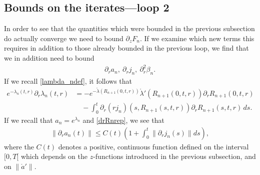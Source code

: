 \documentclass[11pt]{article}
\begin{document}
\subsection{Bounds on the iterates---loop 2}\label{loop2}
%
%
In order to see that the quantities which were
bounded in the previous subsection
do actually converge we need to bound $\partial_z F_n$. If we examine which new
terms this requires in addition to those already bounded in the previous loop,
we find that we in addition need to bound
\begin{align}\label{loop2aim}
  \partial_r a_n,\ \partial_r j_n,\ \partial_r^2 \beta_n .
\end{align}
If we recall \eqref{lambda_ndef}, it follows that
\begin{align*}
  e^{-\lambda_n(t,r)} \partial_r\lambda_n(t,r)
  &= -e^{-\mathring{\lambda}(R_{n+1}(0,t,r))}\mathring{\lambda}'(R_{n+1}(0,t,r))
  \partial_r R_{n+1}(0,t,r)\\
  &\quad
  {}- \int_0^t \partial_r(r j_n)(s,R_{n+1}(s,t,r)) \partial_r R_{n+1}(s,t,r)\, ds.
\end{align*}
If we recall that $a_n=e^{\lambda_n}$ and \eqref{drRnrep}, we see that
\begin{align}\label{dra_nest}
  \|\partial_r a_n(t)\| \leq C(t)\left(1+\int_0^t\|\partial_r j_n(s)\| ds\right),
\end{align}
where the $C(t)$ denotes a positive, continuous function defined on the interval
$[0,T[$ which depends on the $z$-functions introduced in the previous
subsection, and on $\|\mathring{a}'\|$.
\end{document}

